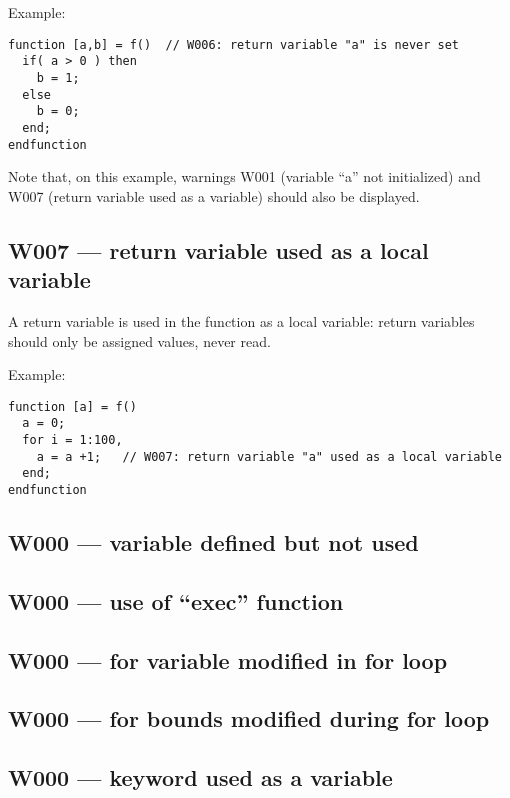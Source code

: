 Example:\begin{verbatim}
function [a,b] = f()  // W006: return variable "a" is never set
  if( a > 0 ) then
    b = 1;
  else
    b = 0;
  end;
endfunction
\end{verbatim}
Note that, on this example, warnings W001 (variable ``a'' not initialized)
and W007 (return variable used as a variable) should also be displayed.



\subsection{W007 --- return variable used as a local variable}




A return variable is used in the function as a local variable: return
variables should only be assigned values, never read.



Example:\begin{verbatim}
function [a] = f()
  a = 0;
  for i = 1:100,
    a = a +1;   // W007: return variable "a" used as a local variable
  end;
endfunction
\end{verbatim}




\subsection{W000 --- variable defined but not used}




\subsection{W000 --- use of ``exec'' function     }




\subsection{W000 --- for variable modified in for loop}




\subsection{W000 --- for bounds modified during for loop}




\subsection{W000 --- keyword used as a variable}




